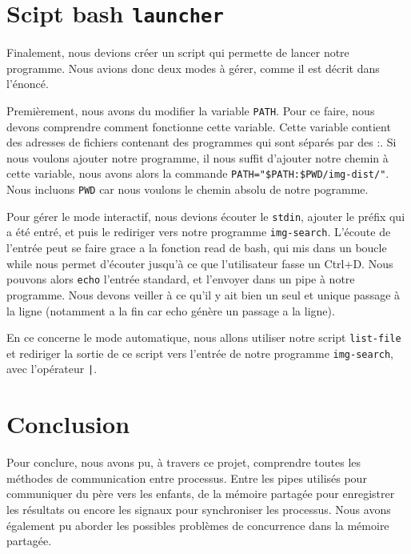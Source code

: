 \documentclass[french]{article}
\begin{document}
\section{Scipt bash \texttt{launcher}}
Finalement, nous devions créer un script qui permette de lancer notre programme. Nous avions donc deux modes à gérer, comme il est décrit dans l'énoncé. 

Premièrement, nous avons du modifier la variable \texttt{PATH}. Pour ce faire, nous devons comprendre comment fonctionne cette variable. Cette variable contient des 
adresses de fichiers contenant des programmes qui sont séparés par des :. Si nous voulons ajouter notre programme, il nous suffit d'ajouter notre chemin à cette 
variable, nous avons alors la commande \texttt{PATH="\$PATH:\$PWD/img-dist/"}. Nous incluons \texttt{PWD} car nous voulons le chemin absolu de notre pogramme. 

Pour gérer le mode interactif, nous devions écouter le \texttt{stdin}, ajouter le préfix qui a été entré, et puis le rediriger vers notre programme \texttt{img-search}. 
L'écoute de l'entrée peut se faire grace a la fonction read de bash, qui mis dans un boucle while nous permet d'écouter jusqu'à ce que l'utilisateur fasse un Ctrl+D. 
Nous pouvons alors \texttt{echo} l'entrée standard, et l'envoyer dans un pipe à notre programme. Nous devons veiller à ce qu'il y ait bien un seul et unique 
passage à la ligne (notamment a la fin car echo génère un passage a la ligne).

En ce concerne le mode automatique, nous allons utiliser notre script \texttt{list-file} et rediriger la sortie de ce script vers l'entrée 
de notre programme \texttt{img-search}, avec l'opérateur \texttt{|}. 

\section{Conclusion}
Pour conclure, nous avons pu, à travers ce projet, comprendre toutes les méthodes de communication entre processus. Entre les pipes utilisés pour communiquer du 
père vers les enfants, de la mémoire partagée pour enregistrer les résultats ou encore les signaux pour synchroniser les processus. Nous avons également pu 
aborder les possibles problèmes de concurrence dans la mémoire partagée.
\end{document}
